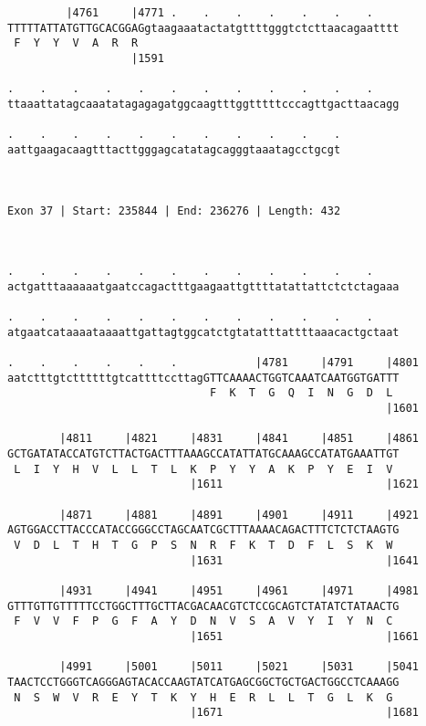 \documentclass{article}
\begin{document}
\begin{Verbatim}
         |4761     |4771 .    .    .    .    .    .    .    
TTTTTATTATGTTGCACGGAGgtaagaaatactatgttttgggtctcttaacagaatttt
 F  Y  Y  V  A  R  R                                        
                   |1591                                    
  
.    .    .    .    .    .    .    .    .    .    .    .    
ttaaattatagcaaatatagagagatggcaagtttggtttttcccagttgacttaacagg
                                                            
.    .    .    .    .    .    .    .    .    .    .
aattgaagacaagtttacttgggagcatatagcagggtaaatagcctgcgt
                                                   
                                                   
 
Exon 37 | Start: 235844 | End: 236276 | Length: 432



.    .    .    .    .    .    .    .    .    .    .    .    
actgatttaaaaaatgaatccagactttgaagaattgttttatattattctctctagaaa
                                                            
.    .    .    .    .    .    .    .    .    .    .    .    
atgaatcataaaataaaattgattagtggcatctgtatatttattttaaacactgctaat
                                                            
.    .    .    .    .    .            |4781     |4791     |4801
aatctttgtcttttttgtcattttccttagGTTCAAAACTGGTCAAATCAATGGTGATTT
                               F  K  T  G  Q  I  N  G  D  L 
                                                          |1601
  
        |4811     |4821     |4831     |4841     |4851     |4861
GCTGATATACCATGTCTTACTGACTTTAAAGCCATATTATGCAAAGCCATATGAAATTGT
 L  I  Y  H  V  L  L  T  L  K  P  Y  Y  A  K  P  Y  E  I  V 
                            |1611                         |1621
  
        |4871     |4881     |4891     |4901     |4911     |4921
AGTGGACCTTACCCATACCGGGCCTAGCAATCGCTTTAAAACAGACTTTCTCTCTAAGTG
 V  D  L  T  H  T  G  P  S  N  R  F  K  T  D  F  L  S  K  W 
                            |1631                         |1641
  
        |4931     |4941     |4951     |4961     |4971     |4981
GTTTGTTGTTTTTCCTGGCTTTGCTTACGACAACGTCTCCGCAGTCTATATCTATAACTG
 F  V  V  F  P  G  F  A  Y  D  N  V  S  A  V  Y  I  Y  N  C 
                            |1651                         |1661
  
        |4991     |5001     |5011     |5021     |5031     |5041
TAACTCCTGGGTCAGGGAGTACACCAAGTATCATGAGCGGCTGCTGACTGGCCTCAAAGG
 N  S  W  V  R  E  Y  T  K  Y  H  E  R  L  L  T  G  L  K  G 
                            |1671                         |1681
  

\end{Verbatim}
\end{document}
